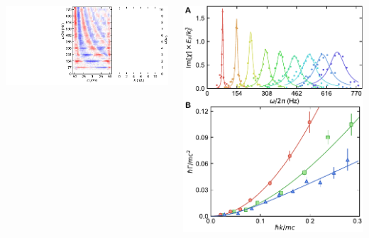 \documentclass[26pt, paperwidth=36in,paperheight=48in]{tikzposter} %
\begin{document}
\begin{columns}
{\begin{minipage}{0.2\textwidth}
	\end{minipage}
	\hspace{-3cm}
	\begin{minipage}{0.13\textwidth}
		\vspace{1.7cm}
		\includegraphics[width=9cm,
		trim=5cm 0cm 5.2cm 0cm,clip]{figures/fundamental_modes_redone.pdf}
	\end{minipage}
	\hspace{-2cm}
	\begin{minipage}{0.3\textwidth}
		\includegraphics[width=10cm]{figures/First Sound Resonance Widths.pdf}
		\hspace{0.1cm}

\end{minipage}}
\end{columns}
\end{document}
